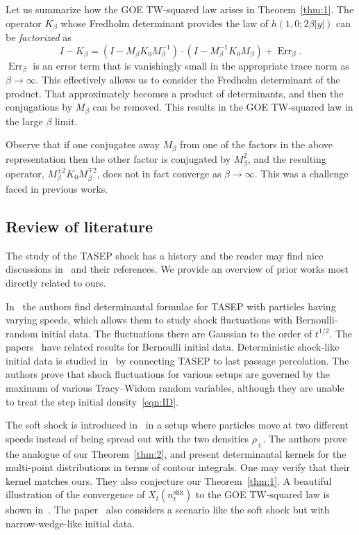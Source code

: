 \documentclass[10pt]{amsart}
\theoremstyle{definition}\newtheorem{defi}[theo]{Definition}\newtheorem{rema}[theo]{Remark}\newtheorem{exam}[theo]{Example}\newtheorem{exem}[theo]{Example}\newtheorem{nota}[theo]{Notation}
\DeclareMathOperator{\shk}{shk}
\DeclareMathOperator{\err}{Err}
\begin{document}
Let us summarize how the GOE TW-squared law arises in Theorem~\ref{thm:1}. The operator $K_{\beta}$ whose Fredholm determinant provides the law of $h(1,0;2\beta |y|)$ can be \emph{factorized} as
\[
I-K_{\beta} = (I - M_{\beta} K_0M^{-1}_{\beta}) \cdot (I - M^{-1}_{\beta} K_0 M_{\beta}) + \err_{\beta}.
\]
$\err_{\beta}$ is an error term that is vanishingly small in the appropriate trace norm as $\beta \to \infty$. This effectively allows us to consider the Fredholm determinant of the product. That approximately becomes a product of determinants, and then the conjugations by $M_{\beta}$ can be removed. This results in the GOE TW-squared law in the large $\beta$ limit.

Observe that if one conjugates away $M_{\beta}$ from one of the factors in the above representation then the other factor is conjugated by $M^2_{\beta}$, and the resulting operator, $M^{\pm2}_{\beta}K_0 M^{\mp2}_{\beta}$, does not in fact converge as $\beta \to \infty$. This was a challenge faced in previous works.

\subsection{Review of literature} \label{sec:lit}
The study of the TASEP shock has a history and the reader may find nice discussions in~\cite{F2, FFV} and their references. We provide an overview of prior works most directly related to ours.

In~\cite{BFS} the authors find determinantal formulae for TASEP with particles having varying speeds, which allows them to study shock fluctuations with Bernoulli-random initial data. The fluctuations there are Gaussian to the order of $t^{1/2}$. The papers~\cite{BC, CFP, FFV} have related results for Bernoulli initial data. Deterministic shock-like initial data is studied in~\cite{FN1, FN3} by connecting TASEP to last passage percolation. The authors prove that shock fluctuations for various setups are governed by the maximum of various Tracy--Widom random variables, although they are unable to treat the step initial density~\eqref{eqn:ID}.

The soft shock is introduced in~\cite{FN2} in a setup where particles move at two different speeds instead of being spread out with the two densities $\rho_{\pm}$. The authors prove the analogue of our Theorem~\ref{thm:2}, and present determinantal kernels for the multi-point distributions in terms of contour integrals. One may verify that their kernel matches ours. They also conjecture our Theorem~\ref{thm:1}. A beautiful illustration of the convergence of $X_t(n^{\shk}_t)$ to the GOE TW-squared law is shown in~\cite[Figure~1]{FN2}. The paper~\cite{N} also considers a scenario like the soft shock but with narrow-wedge-like initial data.
\end{document}
